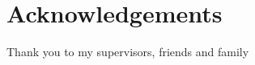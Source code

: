 \chapter*{\centering Acknowledgements}
\noindent 
Thank you to my supervisors, friends and family 
\newpage